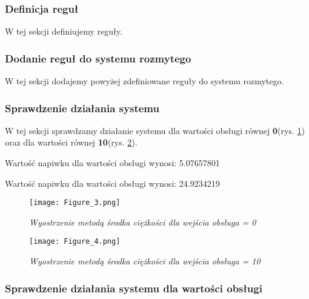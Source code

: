 

\subsubsection{Definicja reguł}\label{ssc:definicja_regul}

W tej sekcji definiujemy reguły.



\subsubsection{Dodanie reguł do systemu rozmytego}\label{ssc:dodanie_regul}

W tej sekcji dodajemy powyżej zdefiniowane reguły do systemu rozmytego.



\subsubsection{Sprawdzenie działania systemu}\label{ssc:sprawdzenie_dzialania}

W tej sekcji sprawdzamy działanie systemu dla wartości obsługi równej \textbf{0}(rys. \ref{fig:obsluga0}) oraz dla wartości równej \textbf{10}(rys. \ref{fig:obsluga10}).



Wartość napiwku dla wartości obsługi wynosi: 5.07657801

Wartość napiwku dla wartości obsługi wynosi: 24.9234219

\begin{figure}[H]
	\centering
	\texttt{[image: Figure\_3.png]}
	\caption{\textit{Wyostrzenie metodą środka ciężkości dla wejścia obsługa = 0}}
	\label{fig:obsluga0}
\end{figure}

\begin{figure}[H]
	\centering
	\texttt{[image: Figure\_4.png]}
	\caption{\textit{Wyostrzenie metodą środka ciężkości dla wejścia obsługa = 10}}
	\label{fig:obsluga10}

\end{figure}

\subsubsection{Sprawdzenie działania systemu dla wartości obsługi}\label{ssc:sprawdzenie_dzialania_obsluga}

